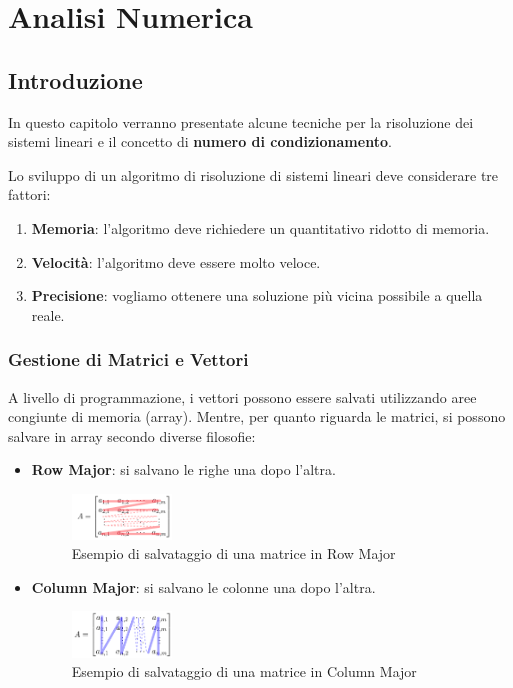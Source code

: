 \chapter{Analisi Numerica}
\section{Introduzione}
In questo capitolo verranno presentate alcune tecniche per la risoluzione dei
sistemi lineari e il concetto di \textbf{numero di condizionamento}.

Lo sviluppo di un algoritmo di risoluzione di sistemi lineari deve considerare
tre fattori:
\begin{enumerate}
    \item \textbf{Memoria}: l'algoritmo deve richiedere un quantitativo ridotto
          di memoria.
    \item \textbf{Velocità}: l'algoritmo deve essere molto veloce.
    \item \textbf{Precisione}: vogliamo ottenere una soluzione più vicina possibile
          a quella reale.
\end{enumerate}
\subsection{Gestione di Matrici e Vettori}
A livello di programmazione, i vettori possono essere salvati utilizzando
aree congiunte di memoria (array). Mentre, per quanto riguarda le matrici, si
possono salvare in array secondo diverse filosofie:
\begin{itemize}
    \item \textbf{Row Major}: si salvano le righe una dopo l'altra.
          \begin{figure}[!ht]
              \centering
              \includegraphics[width=0.25\textwidth]{./img/AnalisiNumerica/RowMajor.png}
              \caption{Esempio di salvataggio di una matrice in Row Major}
          \end{figure}
    \item \textbf{Column Major}: si salvano le colonne una dopo l'altra.
          \begin{figure}[!ht]
              \centering
              \includegraphics[width=0.25\textwidth]{./img/AnalisiNumerica/ColumnMajor.png}
              \caption{Esempio di salvataggio di una matrice in Column Major}
          \end{figure}
\end{itemize}

